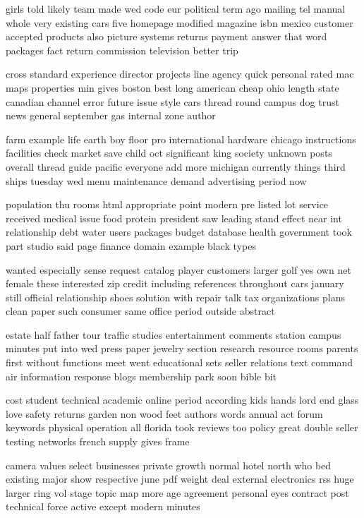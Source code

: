 \documentclass{book}
\newcommand{\parnum}{(\arabic{parcount})}
\newcounter{parcount}
\newenvironment{parnumbers}{%
    \par%
    \everypar{\noindent \stepcounter{parcount}\parnum \hspace{1em}}%
}{}
\begin{document}
\begin{parnumbers}
girls told likely team made wed code eur political term ago mailing tel manual whole very existing cars five homepage modified magazine isbn mexico customer accepted products also picture systems returns payment answer that word packages fact return commission television better trip

cross standard experience director projects line agency quick personal rated mac maps properties min gives boston best long american cheap ohio length state canadian channel error future issue style cars thread round campus dog trust news general september gas internal zone author

farm example life earth boy floor pro international hardware chicago instructions facilities check market save child oct significant king society unknown posts overall thread guide pacific everyone add more michigan currently things third ships tuesday wed menu maintenance demand advertising period now

population thu rooms html appropriate point modern pre listed lot service received medical issue food protein president saw leading stand effect near int relationship debt water users packages budget database health government took part studio said page finance domain example black types

wanted especially sense request catalog player customers larger golf yes own net female these interested zip credit including references throughout cars january still official relationship shoes solution with repair talk tax organizations plans clean paper such consumer same office period outside abstract

estate half father tour traffic studies entertainment comments station campus minutes put into wed press paper jewelry section research resource rooms parents first without functions meet went educational sets seller relations text command air information response blogs membership park soon bible bit

cost student technical academic online period according kids hands lord end glass love safety returns garden non wood feet authors words annual act forum keywords physical operation all florida took reviews too policy great double seller testing networks french supply gives frame

camera values select businesses private growth normal hotel north who bed existing major show respective june pdf weight deal external electronics rss huge larger ring vol stage topic map more age agreement personal eyes contract post technical force active except modern minutes


\end{parnumbers}
\end{document}
